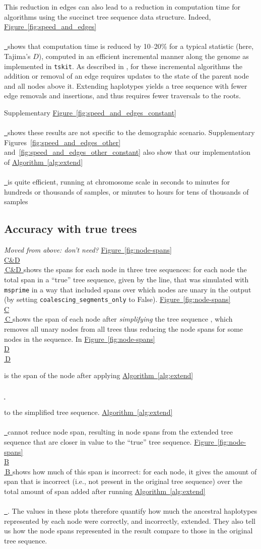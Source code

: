 \documentclass[10pt,twoside,lineno]{gsajnl}
\newcommand{\tskit}{\texttt{tskit}}
\newcommand{\msprime}{\texttt{msprime}}
\newcommand{\comment}[1]{{\color{violet} \it #1}}
\newcommand{\algorithmref}[2][]{%
	\hyperref[{#2}]{%
		Algorithm~\ref*{#2}%
		\ifx\\#1\\%
		\else
		\,#1%
		\fi
	}%
}
\newcommand*{\figref}[2][]{%
	\hyperref[{#2}]{%
		Figure~\ref*{#2}%
		\ifx\\#1\\%
		\else
		\,#1%
		\fi
	}%
}
\begin{document}
This reduction in edges can also lead to a reduction in computation time for
algorithms using the succinct tree sequence data structure.
Indeed, \figref{fig:speed_and_edges} shows that computation time is reduced by 10--20\%
for a typical statistic (here, Tajima's $D$),
computed in an efficient incremental manner along the genome as implemented in \tskit.
As described in \citet{ralph2020efficiently}, for these incremental algorithms
the addition or removal of an edge requires updates
to the state of the parent node and all nodes above it.
Extending haplotypes yields a tree sequence with fewer edge removals and insertions, 
and thus requires fewer traversals to the roots.

Supplementary \figref{fig:speed_and_edges_constant} shows these results are not specific
to the demographic scenario.
Supplementary Figures~\ref{fig:speed_and_edges_other}
and~\ref{fig:speed_and_edges_other_constant}
also show that our implementation of \algorithmref{alg:extend} is quite efficient,
running at chromosome scale in seconds to minutes for hundreds or thousands of samples,
or minutes to hours for tens of thousands of samples


\subsection{Accuracy with true trees}

\comment{Moved from above: don't need?}
\figref[C\&D]{fig:node-spans} shows the spans for each node in three tree sequences:
for each node the total span in a ``true'' tree sequence, 
given by the line,
that was simulated with \msprime \citep{kelleher2016efficient,baumdicker2021efficient}
in a way that included spans over which nodes are unary in the output
(by setting \texttt{coalescing\_segments\_only} to False).
\figref[C]{fig:node-spans} shows the span of each node after \emph{simplifying} the tree sequence 
\citep{kelleher2018efficient},
which removes all unary nodes from all trees
thus reducing the node spans for some nodes in the sequence.
In \figref[D]{fig:node-spans}
is the span of the node after applying \algorithmref{alg:extend}
to the simplified tree sequence.
\algorithmref{alg:extend} cannot reduce node span, resulting in node spans 
from the extended tree sequence that are closer in value to the ``true'' tree sequence. 
\figref[B]{fig:node-spans} shows how much of this span is incorrect:
for each node, it gives the amount of span
that is incorrect (i.e., not present in the original tree sequence)
over the total amount of span added after running \algorithmref{alg:extend}.
The values in these plots
therefore quantify how much the ancestral haplotypes represented by each node
were correctly, and incorrectly, extended.
They also tell us how the node spans represented in the result compare to those in the original tree sequence.
\end{document}
